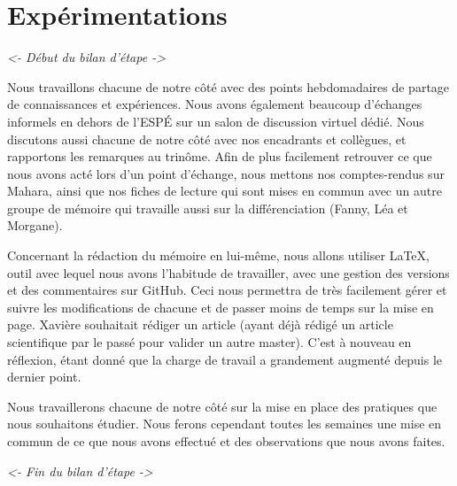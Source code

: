 \section{Expérimentations}

\textit{<- Début du bilan d'étape ->}

Nous travaillons chacune de notre côté avec des points hebdomadaires de partage de connaissances et expériences. Nous avons également beaucoup d’échanges informels en dehors de l’ESPÉ sur un salon de discussion virtuel dédié. Nous discutons aussi chacune de notre côté avec nos encadrants et collègues, et rapportons les remarques au trinôme.
Afin de plus facilement retrouver ce que nous avons acté lors d’un point d’échange, nous mettons nos comptes-rendus sur Mahara, ainsi que nos fiches de lecture qui sont mises en commun avec un autre groupe de mémoire qui travaille aussi sur la différenciation (Fanny, Léa et Morgane).

Concernant la rédaction du mémoire en lui-même, nous allons utiliser LaTeX, outil avec lequel nous avons l’habitude de travailler, avec une gestion des versions et des commentaires sur GitHub. Ceci nous permettra de très facilement gérer et suivre les modifications de chacune et de passer moins de temps sur la mise en page.
Xavière souhaitait rédiger un article (ayant déjà rédigé un article scientifique par le passé pour valider un autre master). C’est à nouveau en réflexion, étant donné que la charge de travail a grandement augmenté depuis le dernier point.

Nous travaillerons chacune de notre côté sur la mise en place des pratiques que nous souhaitons étudier. Nous ferons cependant toutes les semaines une mise en commun de ce que nous avons effectué et des observations que nous avons faites.

\textit{<- Fin du bilan d'étape ->}